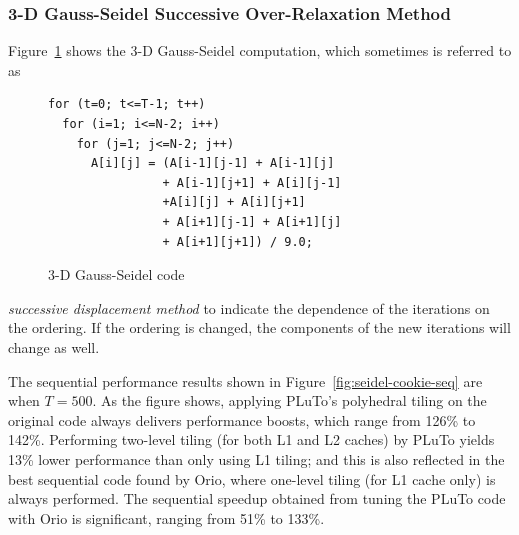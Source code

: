 \subsubsection{3-D Gauss-Seidel Successive Over-Relaxation Method}  
Figure~\ref{fig:seidel-code} shows the 3-D Gauss-Seidel computation, 
which sometimes is referred to as
%
\begin{figure}
\vspace{-0.2in}
\begin{center}
\begin{minipage}{3in} 
\scriptsize
\begin{verbatim} 
for (t=0; t<=T-1; t++) 
  for (i=1; i<=N-2; i++) 
    for (j=1; j<=N-2; j++) 
      A[i][j] = (A[i-1][j-1] + A[i-1][j] 
                + A[i-1][j+1] + A[i][j-1] 
                +A[i][j] + A[i][j+1] 
                + A[i+1][j-1] + A[i+1][j] 
                + A[i+1][j+1]) / 9.0; 
\end{verbatim} 
\end{minipage} 
\end{center}
\vspace{-0.1in}
\caption{3-D Gauss-Seidel code} 
\label{fig:seidel-code} 
\end{figure}
%
\emph{successive displacement method} to indicate the dependence of the iterations on the 
ordering. If the ordering is changed, the components of the new 
iterations will change as well. 
 
The sequential performance results shown in
Figure~\ref{fig:seidel-cookie-seq} are when $T=500$. As the figure
shows, applying PLuTo's polyhedral tiling on the original code always
delivers performance boosts, which range from 126\% to
142\%. Performing two-level tiling (for both L1 and L2 caches) by
PLuTo yields 13\% lower performance than only using L1 tiling; and
this is also reflected in the best sequential code found by Orio,
where one-level tiling (for L1 cache only) is always performed. The
sequential speedup obtained from tuning the PLuTo code with Orio is
significant, ranging from 51\% to 133\%.

